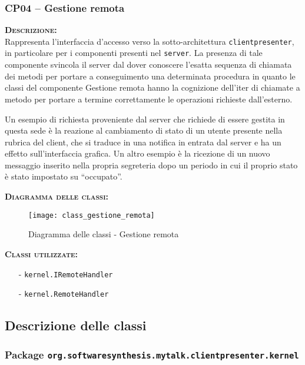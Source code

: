 \subsubsection{CP04 -- Gestione remota}
\begin{description}
	\item{\scshape\bfseries Descrizione:}\\
Rappresenta l'interfaccia d'accesso verso la sotto-architettura \texttt{clientpresenter}, in particolare per i componenti presenti nel \texttt{server}. La presenza di tale componente svincola il server dal dover conoscere l'esatta sequenza di chiamata dei metodi per portare a conseguimento una determinata procedura in quanto le classi del componente \textsf{Gestione remota} hanno la cognizione dell'iter di chiamate a metodo per portare a termine correttamente le operazioni richieste dall'esterno.

Un esempio di richiesta proveniente dal server che richiede di essere gestita in questa sede è la reazione al cambiamento di stato di un utente presente nella rubrica del client, che si traduce in una notifica in entrata dal server e ha un effetto sull'interfaccia grafica. Un altro esempio è la ricezione di un nuovo messaggio inserito nella propria segreteria dopo un periodo in cui il proprio stato è stato impostato su ``occupato''.

\item{\scshape\bfseries Diagramma delle classi:}
\begin{figure}[H]
  \centering
  \texttt{[image: class\_gestione\_remota]}
  \caption{Diagramma delle classi - Gestione remota}\label{fig:gestioneremota}
\end{figure}

	\item{\scshape\bfseries Classi utilizzate:} 
	\begin{itemize}[noitemsep,nolistsep]
		\item[-] \texttt{kernel.IRemoteHandler}
		\item[-] \texttt{kernel.RemoteHandler}
	\end{itemize}
\end{description}

\subsection{Descrizione delle classi}

\subsubsection{Package \texttt{org.softwaresynthesis.mytalk.clientpresenter.kernel}}

